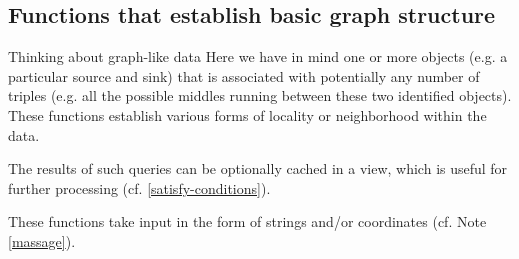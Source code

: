 \subsection*{Functions that establish basic graph structure}

\begin{notate}{Thinking about graph-like data} \label{graph-like-data}
Here we have in mind one or more objects (e.g. a
particular source and sink) that is associated with
potentially any number of triples (e.g. all the possible
middles running between these two identified objects).
These functions establish various forms of locality or
neighborhood within the data.

The results of such queries can be optionally cached in a
view, which is useful for further processing
(cf. \ref{satisfy-conditions}).

These functions take input in the form of strings and/or
coordinates (cf. Note \ref{massage}).
\end{notate}

